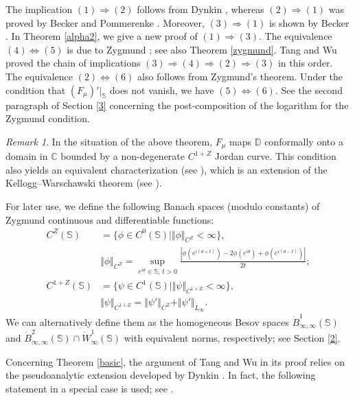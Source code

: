 \documentclass[amstex]{amsart}
\theoremstyle{definition}
\theoremstyle{remark}
\newtheorem{remark}[theorem]{Remark}
\numberwithin{equation}{section}
\begin{document}
The implication $(1) \Rightarrow (2)$ follows from Dyn\cprime kin \cite[Theorem 1]{Dy}, 
whereas $(2) \Rightarrow (1)$ was proved by Becker and Pommerenke \cite[Satz 4]{BP}.
Moreover, $(3) \Rightarrow (1)$ is shown by Becker \cite[Theorem 3]{Be}.
In Theorem \ref{alpha2}, we give a new proof of $(1) \Rightarrow (3)$.
The equivalence $(4) \Leftrightarrow (5)$ is due to Zygmund \cite[Theorem 13]{Zy}; see also Theorem \ref{zygmund}. 
Tang and Wu \cite[Theorem 2.6]{TW1} proved the chain of implications $(3) \Rightarrow (4) \Rightarrow (2) \Rightarrow (3)$ in this order. 
The equivalence $(2) \Leftrightarrow (6)$ also follows from Zygmund's theorem. 
Under the condition that $(F_\mu)'|_{\mathbb S}$ does not vanish, we have $(5) \Leftrightarrow (6)$.
See the second paragraph of Section \ref{3} concerning the post-composition of the logarithm
for the Zygmund condition.

\begin{remark}
In the situation of the above theorem, $F_\mu$ maps $\mathbb D$ conformally onto a domain in $\mathbb C$
bounded by a non-degenerate $C^{1+Z}$ Jordan curve.
This condition also yields an equivalent characterization (see \cite[Theorem 2.4]{TW1}),
which is an extension of the Kellogg--Warschawski theorem (see \cite[Theorem 3.6]{Pom}).
\end{remark}

For later use, we define the
following Banach spaces (modulo constants) of Zygmund continuous and differentiable functions:
\begin{align*}
C^Z(\mathbb S)&=\{\phi \in C^0(\mathbb S) \mid \Vert \phi \Vert_{C^Z}<\infty\},\\
& \Vert \phi \Vert_{C^Z}
=\sup_{e^{i\theta} \in {\mathbb S},\, t>0}\frac{|\phi(e^{i(\theta+t)}) - 2\phi(e^{i\theta}) + \phi(e^{i(\theta-t)})|}{2t};\\
C^{1+Z}(\mathbb S)&=\{\psi \in C^1(\mathbb S) \mid \Vert \psi \Vert_{C^{1+Z}}<\infty\},\\
& \Vert \psi \Vert_{C^{1+Z}}
=\Vert \psi' \Vert_{C^{Z}}+\Vert \psi' \Vert_{L_\infty}.
\end{align*}
We can alternatively define them as the homogeneous Besov spaces $\dot B_{\infty,\infty}^1(\mathbb S)$ and 
$\dot B_{\infty,\infty}^2(\mathbb S) \cap \dot W^1_\infty(\mathbb S)$ with equivalent norms, respectively; see Section \ref{2}.

Concerning Theorem \ref{basic},
the argument of Tang and Wu in its proof relies on the pseudoanalytic extension
developed by Dyn\cprime kin \cite[Theorem 1]{Dyps}. In fact, the following statement in a special case is used; see \cite[Lemma 2.1]{TW1}.
\end{document}
